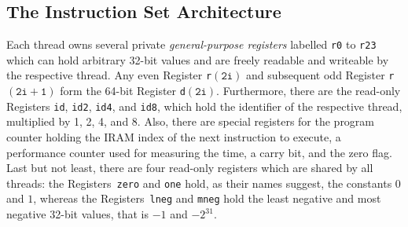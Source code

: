 \subsection{The Instruction Set Architecture}
\label{sec:prereq:arch:isa}

Each thread owns several private \emph{general-purpose registers} labelled \lstinline|r0| to \lstinline|r23| which can hold arbitrary 32-bit values and are freely readable and writeable by the respective thread.
Any even Register \lstinline|r|\(\mathtt{(2i)}\) and subsequent odd Register \lstinline|r|\(\mathtt{(2i+1)}\) form the 64-bit Register \lstinline|d|\(\mathtt{(2i)}\).
Furthermore, there are the read-only Registers \lstinline|id|, \lstinline|id2|, \lstinline|id4|, and \lstinline|id8|, which hold the identifier of the respective thread, multiplied by 1, 2, 4, and 8.
Also, there are special registers for the program counter holding the \ac{IRAM} index of the next instruction to execute, a performance counter used for measuring the time, a carry bit, and the zero flag.
Last but not least, there are four read-only registers which are shared by all threads:
the Registers~\lstinline|zero| and \lstinline|one| hold, as their names suggest, the constants \(0\) and \(1\), whereas the Registers~\lstinline|lneg| and \lstinline|mneg| hold the least negative and most negative 32-bit values, that is \(-1\) and \(-2^{31}\).

